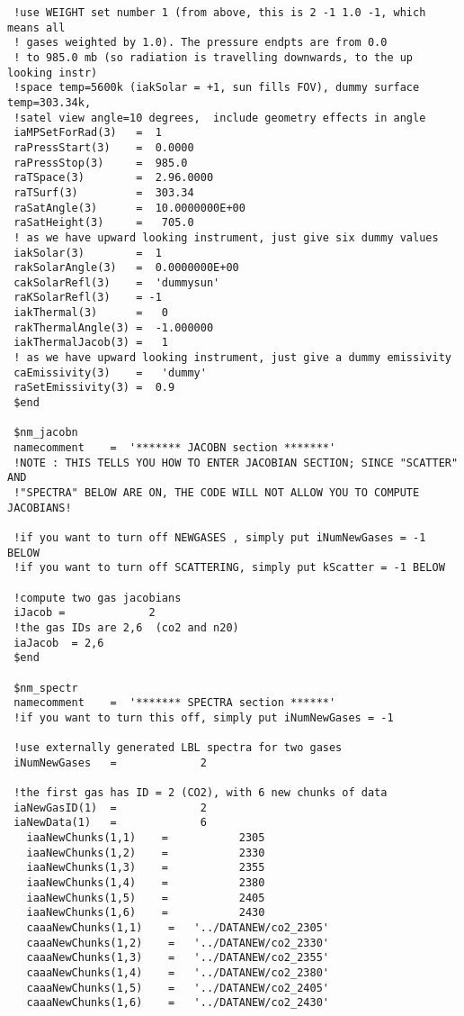 \documentclass[12pt]{article}
\begin{document}
\begin{scriptsize}
\begin{verbatim}
 !use WEIGHT set number 1 (from above, this is 2 -1 1.0 -1, which means all 
 ! gases weighted by 1.0). The pressure endpts are from 0.0
 ! to 985.0 mb (so radiation is travelling downwards, to the up looking instr)
 !space temp=5600k (iakSolar = +1, sun fills FOV), dummy surface temp=303.34k, 
 !satel view angle=10 degrees,  include geometry effects in angle
 iaMPSetForRad(3)   =  1
 raPressStart(3)    =  0.0000
 raPressStop(3)     =  985.0
 raTSpace(3)        =  2.96.0000
 raTSurf(3)         =  303.34
 raSatAngle(3)      =  10.0000000E+00
 raSatHeight(3)     =   705.0
 ! as we have upward looking instrument, just give six dummy values
 iakSolar(3)        =  1
 rakSolarAngle(3)   =  0.0000000E+00
 cakSolarRefl(3)    =  'dummysun'
 raKSolarRefl(3)    = -1
 iakThermal(3)      =   0
 rakThermalAngle(3) =  -1.000000
 iakThermalJacob(3) =   1
 ! as we have upward looking instrument, just give a dummy emissivity
 caEmissivity(3)    =   'dummy'
 raSetEmissivity(3) =  0.9
 $end

 $nm_jacobn
 namecomment    =  '******* JACOBN section *******'
 !NOTE : THIS TELLS YOU HOW TO ENTER JACOBIAN SECTION; SINCE "SCATTER" AND
 !"SPECTRA" BELOW ARE ON, THE CODE WILL NOT ALLOW YOU TO COMPUTE JACOBIANS!

 !if you want to turn off NEWGASES , simply put iNumNewGases = -1 BELOW
 !if you want to turn off SCATTERING, simply put kScatter = -1 BELOW

 !compute two gas jacobians
 iJacob =             2
 !the gas IDs are 2,6  (co2 and n20)
 iaJacob  = 2,6
 $end

 $nm_spectr
 namecomment    =  '******* SPECTRA section ******'
 !if you want to turn this off, simply put iNumNewGases = -1

 !use externally generated LBL spectra for two gases
 iNumNewGases   =             2

 !the first gas has ID = 2 (CO2), with 6 new chunks of data
 iaNewGasID(1)  =             2
 iaNewData(1)   =             6
   iaaNewChunks(1,1)    =           2305
   iaaNewChunks(1,2)    =           2330
   iaaNewChunks(1,3)    =           2355
   iaaNewChunks(1,4)    =           2380
   iaaNewChunks(1,5)    =           2405
   iaaNewChunks(1,6)    =           2430
   caaaNewChunks(1,1)    =   '../DATANEW/co2_2305'
   caaaNewChunks(1,2)    =   '../DATANEW/co2_2330'
   caaaNewChunks(1,3)    =   '../DATANEW/co2_2355'
   caaaNewChunks(1,4)    =   '../DATANEW/co2_2380'
   caaaNewChunks(1,5)    =   '../DATANEW/co2_2405'
   caaaNewChunks(1,6)    =   '../DATANEW/co2_2430'


\end{verbatim}
\end{scriptsize}
\end{document}
